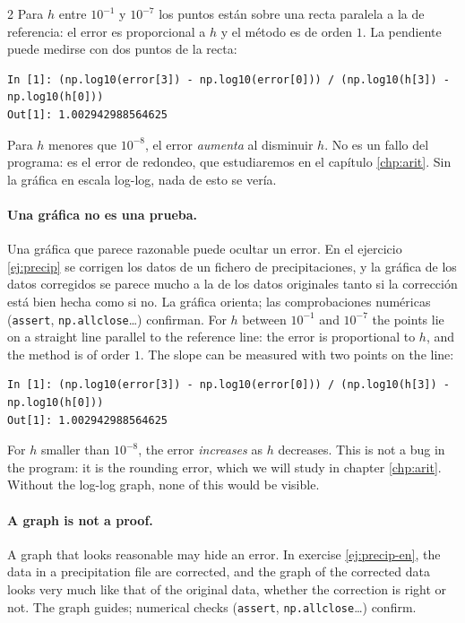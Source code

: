 \begin{paracol}{2}
Para $h$ entre $10^{-1}$ y $10^{-7}$ los puntos están sobre una recta paralela a la de referencia: el error es proporcional a $h$ y el método es de orden $1$. La pendiente puede medirse con dos puntos de la recta:
\begin{verbatim}
In [1]: (np.log10(error[3]) - np.log10(error[0])) / (np.log10(h[3]) - np.log10(h[0]))
Out[1]: 1.002942988564625
\end{verbatim}
Para $h$ menores que $10^{-8}$, el error \emph{aumenta} al disminuir $h$. No es un fallo del programa: es el error de redondeo, que estudiaremos en el capítulo \ref{chp:arit}. Sin la gráfica en escala log-log, nada de esto se vería.

\paragraph{Una gráfica no es una prueba.} Una gráfica que parece razonable puede ocultar un error. En el ejercicio \ref{ej:precip} se corrigen los datos de un fichero de precipitaciones, y la gráfica de los datos corregidos se parece mucho a la de los datos originales tanto si la corrección está bien hecha como si no. La gráfica orienta; las comprobaciones numéricas (\texttt{assert}, \texttt{np.allclose}…) confirman.
\switchcolumn
For $h$ between $10^{-1}$ and $10^{-7}$ the points lie on a straight line parallel to the reference line: the error is proportional to $h$, and the method is of order $1$. The slope can be measured with two points on the line:
\begin{verbatim}
In [1]: (np.log10(error[3]) - np.log10(error[0])) / (np.log10(h[3]) - np.log10(h[0]))
Out[1]: 1.002942988564625
\end{verbatim}
For $h$ smaller than $10^{-8}$, the error \emph{increases} as $h$ decreases. This is not a bug in the program: it is the rounding error, which we will study in chapter \ref{chp:arit}. Without the log-log graph, none of this would be visible.

\paragraph{A graph is not a proof.} A graph that looks reasonable may hide an error. In exercise \ref{ej:precip-en}, the data in a precipitation file are corrected, and the graph of the corrected data looks very much like that of the original data, whether the correction is right or not. The graph guides; numerical checks (\texttt{assert}, \texttt{np.allclose}…) confirm.
\end{paracol}


